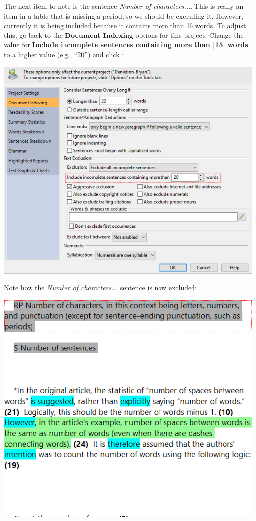 \documentclass[
]{book}
\theoremstyle{definition}
\theoremstyle{definition}
\theoremstyle{definition}
\theoremstyle{definition}
\theoremstyle{remark}
\begin{document}
The next item to note is the sentence \emph{Number of characters...}. This is really an item in a table that is missing a period, so we should be excluding it. However, currently it is being included because it contains more than 15 words. To adjust this, go back to the \textbf{Document Indexing} options for this project. Change the value for \textbf{Include incomplete sentences containing more than {[}15{]} words} to a higher value (e.g., ``20'') and click :

\includegraphics{Images/ExclusionExampleIncompLengthValue.png}

Note how the \emph{Number of characters...} sentence is now excluded:

\begin{center}\includegraphics[width=0.75\linewidth,]{Images/ExclusionExampleLongSentenceExcluded} \end{center}
\end{document}
